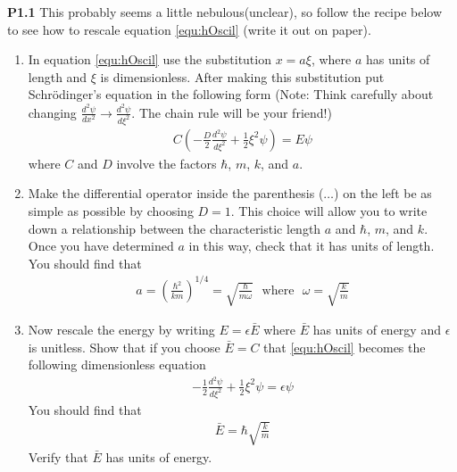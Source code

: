 \vspace{0.25in}
\begin{flushright}
\begin{minipage}{0.9\linewidth}
\noindent\textbf{P1.1} This probably seems a little nebulous(unclear), so follow the recipe below to see how to rescale equation \eqref{equ:hOscil} (write it out on paper).
\flushleft
\begin{enumerate}
 \item In equation \eqref{equ:hOscil} use the substitution $x = a\xi$, where $a$ has units of length and $\xi$ is dimensionless.  After making this substitution put Schr\"{o}dinger's equation in the following form (Note: Think carefully about changing $\frac{d^2\psi}{dx^2} \rightarrow \frac{d^2\psi}{d\xi^2}$. The chain rule will be your friend!)
\begin{align}
C \left( -\frac{D}{2} \frac{d^2\psi}{d\xi^2} + \frac{1}{2} \xi^2 \psi \right) = E\psi
\end{align}
where $C$ and $D$ involve the factors $\hbar$, $m$, $k$, and $a$.
\item Make the differential operator inside the parenthesis ($\dots$)
  on the left be as simple as possible by choosing $D = 1$.  This
  choice will allow you to write down a relationship between the
  characteristic length $a$ and $\hbar$, $m$, and $k$.  Once you have
  determined $a$ in this way, check that it has units of length.  You
  should find that
\begin{align}
  a = \left( \frac{\hbar^2}{km}\right)^{1/4} =
  \sqrt{\frac{\hbar}{m\omega}} ~~~\mathrm{where}~~~ \omega =
  \sqrt{\frac{k}{m}}
\end{align}
\item Now rescale the energy by writing $E = \epsilon\bar{E}$ where
  $\bar{E}$ has units of energy and $\epsilon$ is unitless. Show that
  if you choose $\bar{E} = C$ that \eqref{equ:hOscil} becomes the
  following dimensionless equation
\begin{align}
  -\frac{1}{2} \frac{d^2\psi}{d\xi^2} + \frac{1}{2} \xi^2\psi =
  \epsilon \psi\label{equ:unitLess}
\end{align}
You should find that
\begin{align}
\bar{E} = \hbar \sqrt{\frac{k}{m}}\label{eq:eBar}
\end{align}
Verify that $\bar{E}$ has units of energy. 
\end{enumerate}

\end{minipage}

\end{flushright}


